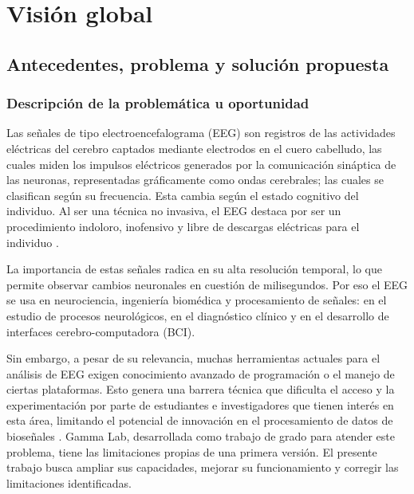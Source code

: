 \documentclass[12pt,letterpaper]{article}
\begin{document}
\section{Visión global}

\subsection{Antecedentes, problema y solución propuesta}



\subsubsection{Descripción de la problemática u oportunidad}

Las señales de tipo electroencefalograma (EEG) son registros de las actividades eléctricas del cerebro captados mediante electrodos en el cuero cabelludo, las cuales miden los impulsos eléctricos generados por la comunicación sináptica de las neuronas, representadas gráficamente como ondas cerebrales; las cuales se clasifican según su frecuencia. Esta cambia según el estado cognitivo del individuo. Al ser una técnica no invasiva, el EEG destaca por ser un procedimiento indoloro, inofensivo y libre de descargas eléctricas para el individuo \cite{pira_eeg_2023}.

La importancia de estas señales radica en su alta resolución temporal, lo que permite observar cambios neuronales en cuestión de milisegundos. Por eso el EEG se usa en neurociencia, ingeniería biomédica y procesamiento de señales: en el estudio de procesos neurológicos, en el diagnóstico clínico y en el desarrollo de interfaces cerebro-computadora (BCI).

Sin embargo, a pesar de su relevancia, muchas herramientas actuales para el análisis de EEG exigen conocimiento avanzado de programación o el manejo de ciertas plataformas. Esto genera una barrera técnica que dificulta el acceso y la experimentación por parte de estudiantes e investigadores que tienen interés en esta área, limitando el potencial de innovación en el procesamiento de datos de bioseñales \cite{chaddad_electroencephalography_2023}. Gamma Lab, desarrollada como trabajo de grado para atender este problema, tiene las limitaciones propias de una primera versión. El presente trabajo busca ampliar sus capacidades, mejorar su funcionamiento y corregir las limitaciones identificadas.
\end{document}
